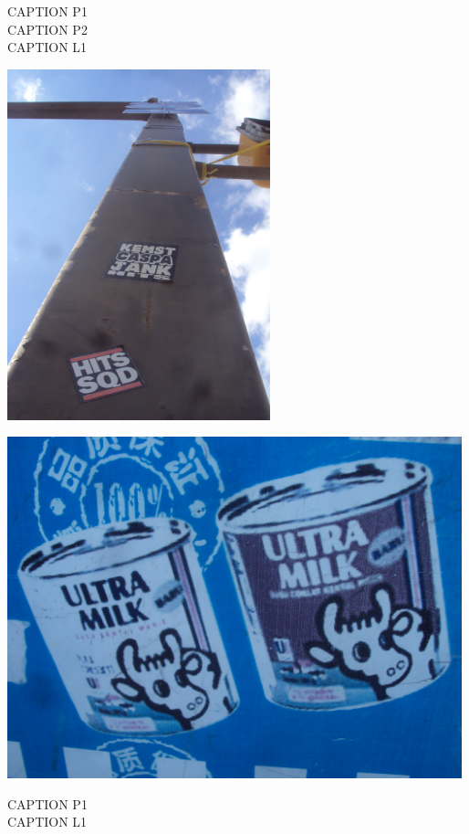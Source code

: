 \documentclass[10pt,letterpaper]{article}
\begin{document}
CAPTION P1\\
CAPTION P2\\
CAPTION L1\\
\pagebreak

\includegraphics[height=4in]{portrait.jpg}

\vspace{0.25in}
\includegraphics[width=5.19in]{landscape.jpg}

CAPTION P1\\
CAPTION L1\\
\pagebreak
\end{document}
